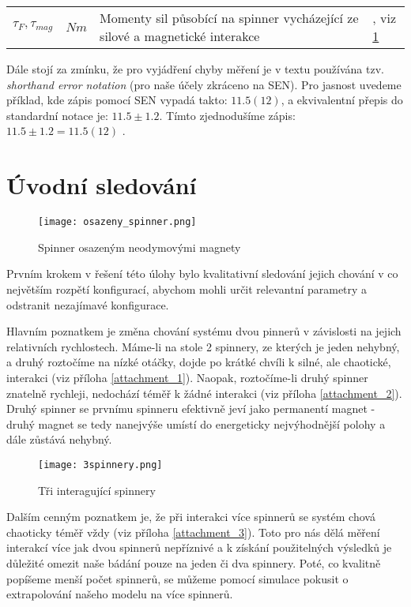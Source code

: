 \documentclass[12pt, a4paper,
 twoside,        %
 openright
]{report}
\begin{document}
\begin{table}[!ht]
\begin{tabularx}{\textwidth}{m{} m{} p{} p{4cm} }
        $\tau_F, \tau_{mag}$                 & $Nm$
                                             & Momenty sil působící na spinner vycházející ze silové a magnetické interakce & \cite{magnetic_torque,torque_def}, viz \ref{}                                                                                        \\
    \end{tabularx}
\end{table}

Dále stojí za zmínku, že pro vyjádření chyby měření je v textu používána tzv. \textit{shorthand error notation} \cite{shorthand_error_notation} (pro naše účely zkráceno na SEN). Pro jasnost uvedeme příklad, kde zápis pomocí SEN vypadá takto: $11.5(12)$, a ekvivalentní přepis do standardní notace je: $11.5 \pm 1.2$. Tímto zjednodušíme zápis: $11.5 \pm 1.2 = 11.5(12)$ \cite{shorthand_error_notation_stack_exchange}.

\chapter{Úvodní sledování}
\begin{wrapfigure}{r}{0.4\textwidth}
    \vspace*{1cm}
    \texttt{[image: osazeny\_spinner.png]}
    \centering
    \caption{Spinner osazeným neodymovými magnety}
    \label{fig:1spinner}
\end{wrapfigure}

Prvním krokem v řešení této úlohy bylo kvalitativní sledování jejich chování v co největším rozpětí konfigurací, abychom mohli určit relevantní parametry a odstranit nezajímavé konfigurace.

Hlavním poznatkem je změna chování systému dvou pinnerů v závislosti na jejich relativních rychlostech.
Máme-li na stole 2 spinnery, ze kterých je jeden nehybný, a druhý roztočíme na nízké otáčky, dojde po krátké chvíli k silné, ale chaotické, interakci (viz příloha \ref{attachment_1}).
Naopak, roztočíme-li druhý spinner znatelně rychleji, nedochází téměř k žádné interakci (viz příloha \ref{attachment_2}).
Druhý spinner se prvnímu spinneru efektivně jeví jako permanentí magnet - druhý magnet se tedy nanejvýše umístí do energeticky nejvýhodnější polohy a dále zůstává nehybný.

\begin{wrapfigure}{l}{0.45\textwidth}
    \vspace*{0.5cm}
    \texttt{[image: 3spinnery.png]}
    \centering
    \caption{Tři interagující spinnery}
    \label{fig:3spinners}
\end{wrapfigure}
Dalším cenným poznatkem je, že při interakci více spinnerů se systém chová chaoticky téměř vždy (viz příloha \ref{attachment_3}).
Toto pro nás dělá měření interakcí více jak dvou spinnerů nepříznivé a k získání použitelných výsledků je důležité omezit naše bádání pouze na jeden či dva spinnery.
Poté, co kvalitně popíšeme menší počet spinnerů, se můžeme pomocí simulace pokusit o extrapolování našeho modelu na více spinnerů.
\end{document}

